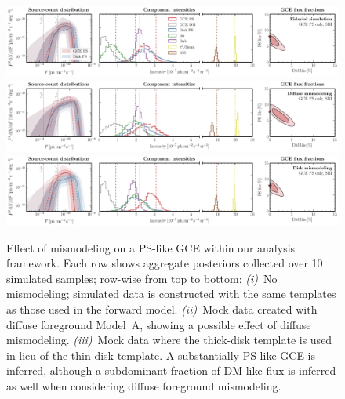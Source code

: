 \documentclass[prd,aps,10pt,nofootinbib,twocolumn,superscriptaddress,preprintnumbers,balancelastpage,longbibliography,floatfix]{revtex4-2}
\begin{document}
%
\begin{figure}[!htbp]
\centering
\includegraphics[width=1.\textwidth]{sim_sbi_ps_agg.pdf}
\includegraphics[width=1.\textwidth]{sim_sbi_modelA_ps.pdf}
\includegraphics[width=1.\textwidth]{sim_sbi_thick_disk_mm_ps.pdf}
\caption{Effect of mismodeling on a PS-like GCE within our analysis framework. Each row shows aggregate posteriors collected over 10 simulated samples; row-wise from top to bottom: \emph{(i)}~No mismodeling; simulated data is constructed with the same templates as those used in the forward model. \emph{(ii)}~Mock data created with diffuse foreground {Model~A}, showing a possible effect of diffuse mismodeling. \emph{(iii)}~Mock data where the thick-disk template is used in lieu of the thin-disk template. A substantially PS-like GCE is inferred, although a subdominant fraction of DM-like flux is inferred as well when considering diffuse foreground mismodeling.}
\label{fig:sim_sbi_mismo_ps}
\end{figure}
%
\end{document}
